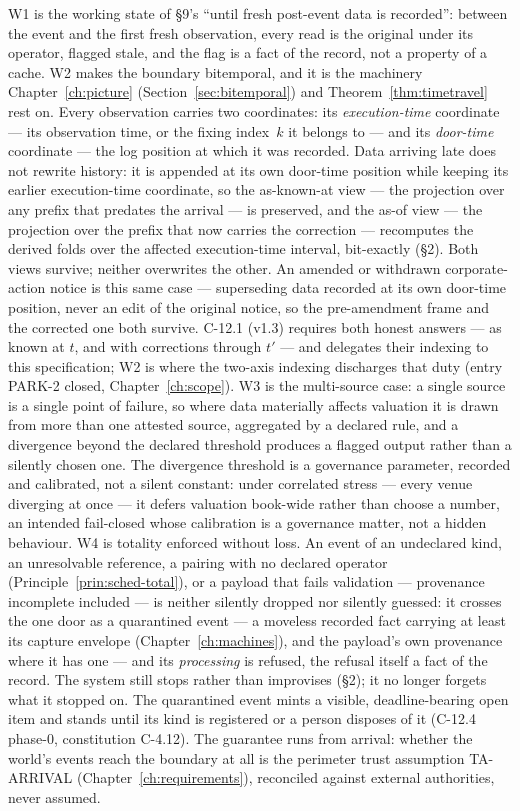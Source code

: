 \documentclass[11pt,a4paper]{article}
\begin{document}
\noindent W1 is the working state of \S 9's ``until fresh post-event data is recorded'':
between the event and the first fresh observation, every read is the original under its operator,
flagged stale, and the flag is a fact of the record, not a property of a cache. W2 makes the
boundary bitemporal, and it is the machinery Chapter~\ref{ch:picture}
(Section~\ref{sec:bitemporal}) and Theorem~\ref{thm:timetravel} rest on. Every observation
carries two coordinates: its \emph{execution-time} coordinate --- its observation time, or the
fixing index~$k$ it belongs to --- and its \emph{door-time} coordinate --- the log
position at which it was recorded. Data arriving late does not rewrite history: it is
appended at its own door-time position while keeping its earlier execution-time
coordinate, so the as-known-at view --- the projection over any prefix that predates the
arrival --- is preserved, and the as-of view --- the projection over the prefix that now
carries the correction --- recomputes the derived folds over the affected execution-time
interval, bit-exactly (\S 2). Both views survive; neither overwrites the other. An amended
or withdrawn corporate-action notice is this same case --- superseding data recorded at
its own door-time position, never an edit of the original notice, so the
pre-amendment frame and the corrected one both survive. C-12.1 (v1.3) requires both honest
answers --- as known at $t$, and with corrections through $t'$ --- and delegates their
indexing to this specification; W2 is where the two-axis indexing discharges that duty
(entry PARK-2 closed, Chapter~\ref{ch:scope}). W3 is the
multi-source case: a single source is a single point of
failure, so where data materially affects valuation it is drawn from more than one
attested source, aggregated by a declared rule, and a divergence beyond the declared
threshold produces a flagged output rather than a silently chosen one. The divergence
threshold is a governance parameter, recorded and calibrated, not a silent constant: under
correlated stress --- every venue diverging at once --- it defers valuation book-wide rather
than choose a number, an intended fail-closed whose calibration is a governance matter, not a
hidden behaviour. W4 is
totality enforced without loss. An event of an undeclared kind, an unresolvable reference,
a pairing with no declared operator (Principle~\ref{prin:sched-total}), or a payload that
fails validation --- provenance incomplete included --- is neither
silently dropped nor silently guessed: it crosses the one door as a quarantined event ---
a moveless recorded fact carrying at least its capture envelope
(Chapter~\ref{ch:machines}), and the payload's own provenance where it has one --- and its
\emph{processing} is refused, the refusal itself a fact of the record. The system still stops rather than improvises
(\S2); it no longer forgets what it stopped on. The quarantined event mints a visible,
deadline-bearing open item and stands until its kind is registered or a person disposes of
it (C-12.4 phase-0, constitution C-4.12). The guarantee runs from arrival: whether the
world's events reach the boundary at all is the perimeter trust assumption TA-ARRIVAL
(Chapter~\ref{ch:requirements}), reconciled against external authorities, never assumed.
\end{document}
